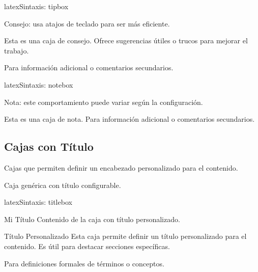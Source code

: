 \begin{codigosimple}{latex}{Sintaxis: tipbox}
\begin{tipbox}
  Consejo: usa atajos de teclado para ser más eficiente.
\end{tipbox}
\end{codigosimple}

\begin{tipbox}
  Esta es una caja de consejo. Ofrece sugerencias útiles o trucos
  para mejorar el trabajo.
\end{tipbox}

Para información adicional o comentarios secundarios.

\begin{codigosimple}{latex}{Sintaxis: notebox}
\begin{notebox}
  Nota: este comportamiento puede variar según la configuración.
\end{notebox}
\end{codigosimple}

\begin{notebox}
  Esta es una caja de nota. Para información adicional o comentarios
  secundarios.
\end{notebox}

\subsection{Cajas con Título}
\label{subsec:cajas-titulo}

Cajas que permiten definir un encabezado personalizado para el contenido.

Caja genérica con título configurable.

\begin{codigosimple}{latex}{Sintaxis: titlebox}
\begin{titlebox}{Mi Título}
  Contenido de la caja con título personalizado.
\end{titlebox}
\end{codigosimple}

\begin{titlebox}{Título Personalizado}
  Esta caja permite definir un título personalizado para el contenido.
  Es útil para destacar secciones específicas.
\end{titlebox}

Para definiciones formales de términos o conceptos.

